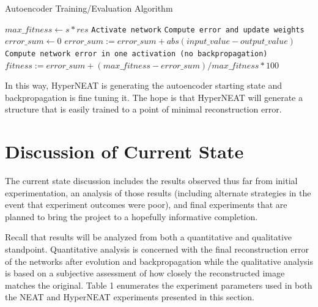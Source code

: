 \documentclass{acm_proc_article-sp}
\begin{document}
\begin{algorithm*}
	\caption{Autoencoder Training/Evaluation Algorithm}
	\begin{algorithmic}[1]
		 
			\State $max\_fitness \gets s * res$ 
						\State \texttt{Activate network}
						\State \texttt{Compute error and update weights}
					\EndWhile
				\EndFor
				\State $error\_sum\gets 0$ 
						\State $error\_sum := error\_sum + abs(input\_value - output\_value)$ 
					\EndFor
					\State \texttt{Compute network error in one activation (no backpropagation)}
				\EndFor
				\State $fitness := error\_sum + (max\_fitness - error\_sum) / max\_fitness * 100$
      		\EndFor
   		\EndProcedure
	\end{algorithmic}
\end{algorithm*}

In this way, HyperNEAT is generating the autoencoder starting state and backpropagation is fine tuning it.  The hope is that HyperNEAT will generate a structure that is easily trained to a point of minimal reconstruction error.

\section{Discussion of Current State}
The current state discussion includes the results observed thus far from initial experimentation, an analysis of those results (including alternate strategies in the event that experiment outcomes were poor), and final experiments that are planned to bring the project to a hopefully informative completion.

Recall that results will be analyzed from both a quantitative and qualitative standpoint.  Quantitative analysis is concerned with the final reconstruction error of the networks after evolution and backpropagation while the qualitative analysis is based on a subjective assessment of how closely the reconstructed image matches the original.  Table 1 enumerates the experiment parameters used in both the NEAT and HyperNEAT experiments presented in this section.
\end{document}
